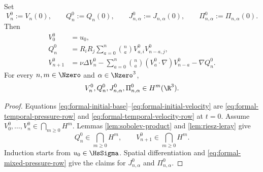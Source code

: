 \begin{lemma}
\label{lem:formal-initial-jet}
Set
\[
 V_n^0:=V_n(0),
 \qquad
 Q_n^0:=Q_n(0),
 \qquad
 J_{n,\alpha}^0:=J_{n,\alpha}(0),
 \qquad
 \Pi_{n,\alpha}^0:=\Pi_{n,\alpha}(0).
\]
Then
\begin{align}
 V_0^0&=u_0,
 \label{eq:formal-initial-base}\\
 Q_n^0
 &=R_iR_j
 \sum_{a=0}^{n}\binom naV_{a,i}^0V_{n-a,j}^0,
 \label{eq:formal-initial-pressure}\\
 V_{n+1}^0
 &=
 \nu\Delta V_n^0
 -\sum_{a=0}^{n}\binom na
 (V_a^0\cdot\nabla)V_{n-a}^0
 -\nabla Q_n^0.
 \label{eq:formal-initial-velocity}
\end{align}
For every \(n,m\in\Nzero\) and \(\alpha\in\Nzero^3\),
\[
 V_n^0,Q_n^0,J_{n,\alpha}^0,\Pi_{n,\alpha}^0\in H^m(\R^3).
\]
\par
\end{lemma}

\begin{proof}
Equations \eqref{eq:formal-initial-base}--\eqref{eq:formal-initial-velocity}
are \eqref{eq:formal-temporal-pressure-row} and
\eqref{eq:formal-temporal-velocity-row} at \(t=0\).  Assume
\(V_0^0,\ldots,V_n^0\in\bigcap_{m\ge0}H^m\).  Lemmas
\ref{lem:sobolev-product} and \ref{lem:riesz-leray} give
\[
 Q_n^0\in\bigcap_{m\ge0}H^m,
 \qquad
 V_{n+1}^0\in\bigcap_{m\ge0}H^m.
\]
Induction starts from \(u_0\in\HsSigma\).  Spatial differentiation and
\eqref{eq:formal-mixed-pressure-row} give the claims for
\(J_{n,\alpha}^0\) and \(\Pi_{n,\alpha}^0\).
\end{proof}

